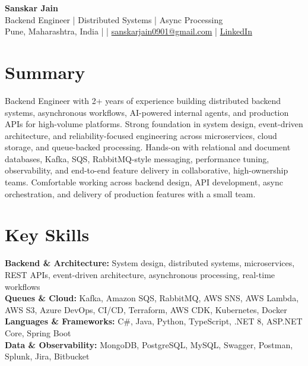 \documentclass[10pt,letterpaper]{article}
\begin{document}
\begin{center}
    {\Large \textbf{Sanskar Jain}} \\
    Backend Engineer | Distributed Systems | Async Processing \\
    Pune, Maharashtra, India \enspace |  \enspace | \enspace
    \href{mailto:sanskarjain0901@gmail.com}{sanskarjain0901@gmail.com} \enspace | \enspace
    \href{https://www.linkedin.com/in/sanskar-jain0901/}{LinkedIn}
\end{center}

\section*{Summary}
Backend Engineer with 2+ years of experience building distributed backend systems, asynchronous workflows, AI-powered internal agents, and production APIs for high-volume platforms. Strong foundation in system design, event-driven architecture, and reliability-focused engineering across microservices, cloud storage, and queue-backed processing. Hands-on with relational and document databases, Kafka, SQS, RabbitMQ-style messaging, performance tuning, observability, and end-to-end feature delivery in collaborative, high-ownership teams. Comfortable working across backend design, API development, async orchestration, and delivery of production features with a small team.

\section*{Key Skills}
\textbf{Backend \& Architecture:} System design, distributed systems, microservices, REST APIs, event-driven architecture, asynchronous processing, real-time workflows \\
\textbf{Queues \& Cloud:} Kafka, Amazon SQS, RabbitMQ, AWS SNS, AWS Lambda, AWS S3, Azure DevOps, CI/CD, Terraform, AWS CDK, Kubernetes, Docker \\
\textbf{Languages \& Frameworks:} C\#, Java, Python, TypeScript, .NET 8, ASP.NET Core, Spring Boot \\
\textbf{Data \& Observability:} MongoDB, PostgreSQL, MySQL, Swagger, Postman, Splunk, Jira, Bitbucket
\end{document}
